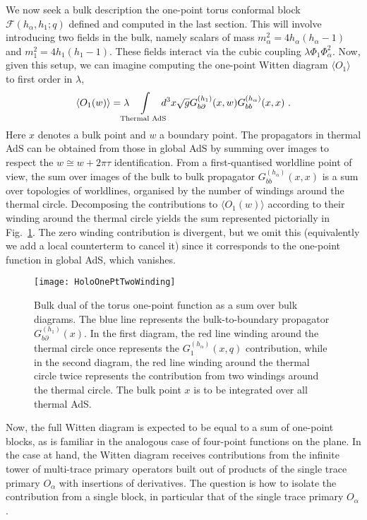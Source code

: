 \documentclass[12pt]{article}
\def\p{\partial}
\newcommand{\Fc}{\mathcal{F}}
\begin{document}
We now seek a bulk description the one-point torus conformal block $\Fc(h_\alpha,h_1;q)$ defined and computed in the last section.  This will involve introducing two fields in the bulk, namely scalars of mass $m_\alpha^2 =4h_\alpha(h_\alpha-1)$ and $m_1^2 = 4h_1(h_1-1)$.  These fields interact via the cubic coupling $\lambda \Phi_1 \Phi_\alpha^2$.    Now, given this setup, we can imagine computing the one-point Witten diagram $\langle O_1 \rangle$ to first order in $\lambda$,
%
\begin{equation} \langle O_1(w) \rangle =
\lambda \mkern-16mu \int\displaylimits_\text{Thermal AdS} \mkern-16mu d^3x \sqrt{g} G_{b\p}^{(h_1)}(x,w)G_{bb}^{(h_\alpha)}(x,x)~. \end{equation}
%
Here $x$ denotes a bulk point and $w$ a boundary point.
The propagators in thermal AdS can be obtained from those in global AdS by summing over images to respect the $w\cong w+2\pi \tau$ identification.  From a first-quantised worldline point of view, the sum over images of the bulk to bulk propagator  $G_{bb}^{(h_\alpha)}(x,x)$ is a sum over topologies of worldlines, organised by the number of windings around the thermal circle.
 Decomposing the contributions to $\langle O_1(w) \rangle $ according to their winding around the thermal circle yields the sum represented pictorially in Fig.~\ref{fig:HoloOnePtTwoWinding}.
  The zero winding contribution is divergent, but we omit this (equivalently we add a local counterterm to cancel it) since it corresponds to the one-point function in global AdS, which vanishes.

 \begin{figure}[h!]
 \centering
  \texttt{[image: HoloOnePtTwoWinding]}
 \caption{Bulk dual of the torus one-point function as a sum over bulk diagrams. The blue line represents the bulk-to-boundary propagator $G_{b\partial}^{(h_1)}(x)$. In the first diagram, the red line winding around the thermal circle once represents the $G_1^{(h_\alpha)}(x,q)$ contribution, while in the second diagram, the red line winding around the thermal circle twice represents the contribution from two windings around the thermal circle. The bulk point $x$ is to be integrated over all thermal AdS.
  \label{fig:HoloOnePtTwoWinding}
}
 \end{figure}

Now, the full Witten diagram is expected to be equal to a sum of one-point blocks, as  is familiar in the analogous case of four-point functions on the plane.  In the case at hand, the Witten diagram receives contributions from the infinite tower of multi-trace primary operators built out of products of the single trace primary $O_\alpha$ with insertions of derivatives. The question is how to isolate the contribution from a single block, in particular that of the single trace primary $O_\alpha$.
\end{document}
